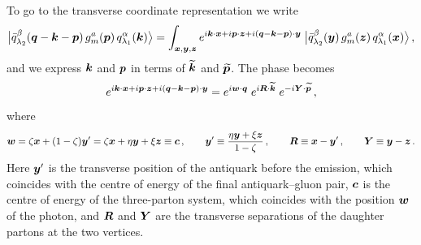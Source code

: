 To go to the transverse coordinate representation we write
\begin{equation}
\big|\bar q^\beta_{\lambda_2}(\bm{q}-\bm{k}-\bm{p})\,g^a_m(\bm{p})\,q^\alpha_{\lambda_1}(\bm{k})\big\rangle
=\int_{\bm{x},\bm{y},\bm{z}}e^{i\bm{k}\cdot\bm{x}+i\bm{p}\cdot\bm{z}+i(\bm{q}-\bm{k}-\bm{p})\cdot\bm{y}}\;
\big|\bar q^\beta_{\lambda_2}(\bm{y})\,g^a_m(\bm{z})\,q^\alpha_{\lambda_1}(\bm{x})\big\rangle\,,
\end{equation}
and we express $\bm{k}$ and $\bm{p}$ in terms of $\widetilde{\bm{k}}$ and $\widetilde{\bm{p}}$. The phase becomes
\begin{equation}
e^{i\bm{k}\cdot\bm{x}+i\bm{p}\cdot\bm{z}+i(\bm{q}-\bm{k}-\bm{p})\cdot\bm{y}}=e^{i\bm{w}\cdot\bm{q}}\;e^{i\bm{R}\cdot\widetilde{\bm{k}}}\;e^{-i\bm{Y}\cdot\widetilde{\bm{p}}}\,,
\label{eq:phase}
\end{equation}
where
\begin{equation}
\bm{w}=\zeta\bm{x}+(1-\zeta)\bm{y}'=\zeta\bm{x}+\eta\bm{y}+\xi\bm{z}\equiv\bm{c}\,,\qquad
\bm{y}'\equiv\frac{\eta\bm{y}+\xi\bm{z}}{1-\zeta}\,,\qquad \bm{R}\equiv\bm{x}-\bm{y}'\,,\qquad\bm{Y}\equiv\bm{y}-\bm{z}\,.
\label{eq:coords}
\end{equation}
Here $\bm{y}'$ is the transverse position of the antiquark before the emission, which coincides with the
centre of energy of the final antiquark--gluon pair, $\bm{c}$ is the centre of energy of the three-parton
system, which coincides with the position $\bm{w}$ of the photon, and $\bm{R}$ and $\bm{Y}$ are the transverse
separations of the daughter partons at the two vertices.


